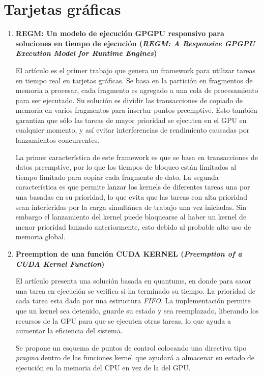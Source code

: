 \section{Tarjetas gráficas}

\begin{enumerate}
\item \textbf{REGM: Un modelo de ejecución GPGPU responsivo para soluciones en tiempo de ejecución
	(\textit{REGM: A Responsive GPGPU Execution Model for Runtime Engines})}
	
	El artículo \cite{RGEM} es el primer trabajo que genera un framework para utilizar tareas en tiempo real en tarjetas gráficas. Se basa en la partición en fragmentos de memoria a procesar, cada fragmento es agregado a una cola de procesamiento para ser ejecutado. Su solución es dividir las transacciones de copiado de memoria en varios fragmentos para insertar puntos preemptive. Esto también garantiza que sólo las tareas de mayor prioridad se ejecuten en el GPU en cualquier momento, y así evitar interferencias de rendimiento causadas por lanzamientos concurrentes.
	
	\vspace{0.3cm}
	
	La primer característica de este framework es que se basa en transacciones de datos preemptive, por lo que los tiempos de bloqueo están limitados al tiempo limitado para copiar cada fragmento de dato. La segunda característica es que permite lanzar los kernels de diferentes tareas una por una basadas en su prioridad, lo que evita que las tareas con alta prioridad sean interferidas por la carga simultánea de trabajo una vez iniciadas. Sin embargo el lanzamiento del kernel puede bloquearse al haber un kernel de menor prioridad lanzado anteriormente, esto debido al probable alto uso de memoria global.
		
	\item \textbf{Preemption de una función CUDA KERNEL
	(\textit{Preemption of a CUDA Kernel Function})}
	
	El artículo \cite{PreeK} presenta una solución basada en quantums, en donde para sacar una tarea en ejecución se verifica si ha terminado su tiempo. La prioridad de cada tarea esta dada por una estructura \textit{FIFO}. La implementación permite que un kernel sea detenido, guarde su estado y sea reemplazado, liberando los recursos de la GPU para que se ejecuten otras tareas, lo que ayuda a aumentar la eficiencia del sistema. 

Se propone un esquema de puntos de control colocando una directiva tipo \textit{pragma} dentro de las funciones kernel que ayudará a almacenar su estado de ejecución en la memoria del CPU en vez de la del GPU.


\end{enumerate}
